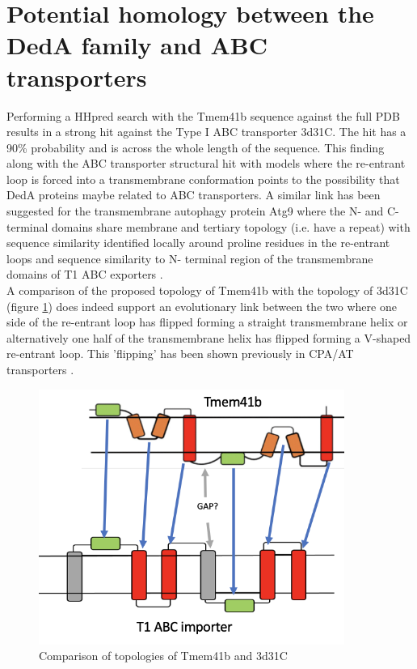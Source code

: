 \section{Potential homology between the DedA family and ABC transporters}
Performing a HHpred search with the Tmem41b sequence against the full PDB results in a strong hit against the Type I ABC transporter 3d31C. The hit has a 90\% probability and is across the whole length of the sequence.  This finding along with the ABC transporter structural hit with models where the re-entrant loop is forced into a transmembrane conformation points to the possibility that DedA proteins maybe related to ABC transporters.   A similar link has been suggested for the transmembrane autophagy protein Atg9 where the N- and C- terminal domains share membrane and tertiary topology (i.e. have a repeat) with sequence similarity identified locally around proline residues in the re-entrant loops and sequence similarity to N- terminal region of the transmembrane domains of T1 ABC exporters \cite{zhang2021evolution}.\\

A comparison of the proposed topology of Tmem41b with the topology of 3d31C (figure \ref{fig:abc_topology}) does indeed support an evolutionary link between the two where one side of the re-entrant loop has flipped forming a straight transmembrane helix or alternatively one half of the transmembrane helix has flipped forming a V-shaped re-entrant loop.  This 'flipping' has been shown previously in CPA/AT transporters \cite{sudha2021evolutionary}.

\begin{figure}[th!]
    \centering
    \includegraphics[width=100mm, scale =0.5]{Results/topology_comparison.png}
    \caption{Comparison of topologies of Tmem41b and 3d31C}
    \label{fig:abc_topology}
    \small
\end{figure}

